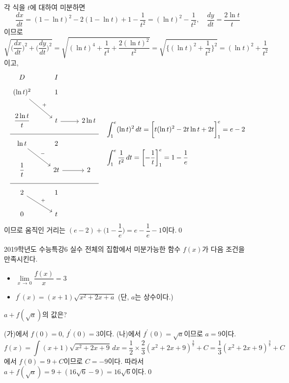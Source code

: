 \documentclass{article}
\begin{document}
\begin{sol}
	각 식을 $t$에 대하여 미분하면
	\[
		\frac{dx}{dt}=(1-\ln t)^2-2(1-\ln t)+1-\frac{1}{t^2}=(\ln t)^2-\frac{1}{t^2},\quad\frac{dy}{dt}=\frac{2\ln t}{t}
	\]
	이므로
	\[
		\sqrt{\biggl(\frac{dx}{dt}\biggr)^2+\biggl(\frac{dy}{dt}\biggr)^2}=\sqrt{(\ln t)^4+\frac{1}{t^4}+\frac{2(\ln t)^2}{t^2}}=\sqrt{\biggl\{(\ln t)^2+\frac{1}{t^2}\biggr\}^2}=(\ln t)^2+\frac{1}{t^2}
	\]
	이고,
	\[
		\begin{tikzcd}
			D & I \\[-12pt]
			(\ln t)^2 \arrow[rd, "+"] & 1 & \\
			\dfrac{2\ln t}{t} & t \arrow[r] & 2\ln t \\[-12pt] \hline \\[-12pt]
			\ln t \arrow[rd, "-"] & 2 & \\
			\dfrac{1}{t} & 2t \arrow[r] & 2 \\[-12pt] \hline \\[-12pt]
			2 \arrow[rd, "+"] & 1 & \\
			0 & t &
		\end{tikzcd}\quad \begin{aligned}
			&\int_1^e(\ln t)^2\,dt=\biggl[t(\ln t)^2-2t\ln t+2t\biggr]_1^e=e-2\\[12pt]
			&\int_1^e\frac{1}{t^2}\,dt=\biggl[-\frac{1}{t}\biggr]_1^e=1-\frac{1}{e}
		\end{aligned}
	\]
	이므로 움직인 거리는 $(e-2)+\biggl(1-\dfrac{1}{e}\biggr)=e-\dfrac{1}{e}-1$이다.\qed
\end{sol}

\newpage
\begin{prob}{2019학년도 수능특강}{6}
	실수 전체의 집합에서 미분가능한 함수 $f(x)$가 다음 조건을 만족시킨다.
	\begin{hint}
		\begin{itemize}
			\item[(가)] $\lim\limits_{x\,\to\,0}\dfrac{f(x)}{x}=3$
			\item[(나)] $f^{\prime}(x)=(x+1)\sqrt{x^2+2x+a}$ (단, $a$는 상수이다.)
		\end{itemize}
	\end{hint}
	$a+f(\sqrt a)$의 값은?
\end{prob}

\begin{sol}
	(가)에서 $f(0)=0$, $f^{\prime}(0)=3$이다. (나)에서 $f^{\prime}(0)=\sqrt a$이므로 $a=9$이다.
	\[
		f(x)=\int(x+1)\sqrt{x^2+2x+9}\,dx=\frac{1}{2}\times\frac{2}{3}(x^2+2x+9)^{\tfrac{3}{2}}+C=\frac{1}{3}(x^2+2x+9)^{\tfrac{3}{2}}+C
	\]
	에서 $f(0)=9+C$이므로 $C=-9$이다. 따라서 $a+f(\sqrt a)=9+(16\sqrt6-9)=16\sqrt6$이다.\qed
\end{sol}
\end{document}
